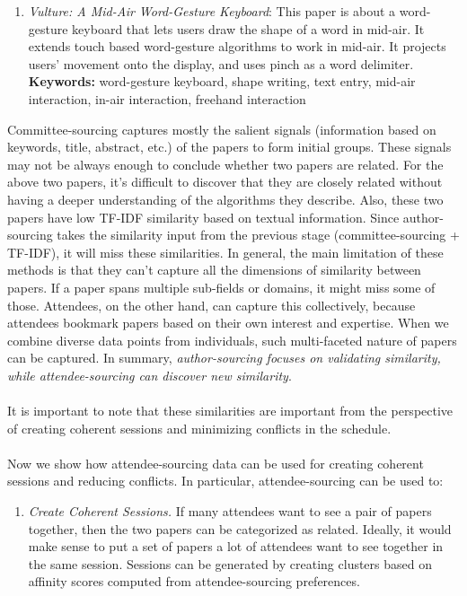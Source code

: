 \documentclass[letterpaper]{article}
\begin{document}
\begin{enumerate}
\begin{enumerate}
\item \emph{Vulture: A Mid-Air Word-Gesture Keyboard}: This paper is about a word-gesture keyboard that lets users draw the shape of a word in mid-air. It extends touch based word-gesture algorithms to work in mid-air. It projects users' movement onto the display, and uses pinch as a word delimiter. \textbf{Keywords:} word-gesture keyboard, shape writing, text entry, mid-air interaction, in-air interaction, freehand interaction
\end{enumerate}
\noindent
Committee-sourcing captures mostly the salient signals (information based on keywords, title, abstract, etc.) of the papers to form initial groups. These signals may not be always enough to conclude whether two papers are related. For the above two papers, it's difficult to discover that they are closely related without having a deeper understanding of the algorithms they describe.  Also, these two papers have low TF-IDF similarity based on textual information. Since author-sourcing takes the similarity input from the previous stage (committee-sourcing + TF-IDF), it will miss these similarities. In general, the main limitation of these methods is that they can't capture all the dimensions of similarity between papers. If a paper spans multiple sub-fields or domains, it might miss some of those. Attendees, on the other hand, can capture this collectively, because attendees bookmark papers based on their own interest and expertise. When we combine diverse data points from individuals, such multi-faceted nature of papers can be captured. In summary, \emph{author-sourcing focuses on validating similarity, while attendee-sourcing can discover new similarity}.
\\
\\
It is important to note that these similarities are important from the perspective of creating coherent sessions and minimizing conflicts in the schedule.
\\
\\
Now we show how attendee-sourcing data can be used for creating coherent sessions and reducing conflicts.  In particular, attendee-sourcing can be used to:
\begin{enumerate}
\item \emph{Create Coherent Sessions.} If many attendees want to see a pair of papers together, then the two papers can be categorized as related. Ideally, it would make sense to put a set of papers a lot of attendees want to see together in the same session. Sessions can be generated by creating clusters based on affinity scores computed from attendee-sourcing preferences.


\end{enumerate}
\end{enumerate}
\end{document}
